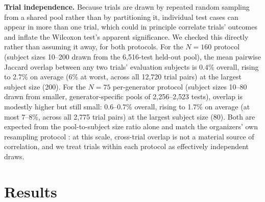 \documentclass[smallextended]{svjour3}
\begin{document}
\textbf{Trial independence.} Because trials are drawn by repeated random
sampling from a shared pool rather than by partitioning it, individual
test cases can appear in more than one trial, which could in principle
correlate trials' outcomes and inflate the Wilcoxon test's apparent
significance. We checked this directly rather than assuming it away, for
both protocols. For the $N=160$ protocol (subject sizes 10--200 drawn from
the 6{,}516-test held-out pool), the mean pairwise Jaccard overlap between
any two trials' evaluation subjects is 0.4\% overall, rising to 2.7\% on
average (6\% at worst, across all 12{,}720 trial pairs) at the largest
subject size (200). For the $N=75$ per-generator protocol (subject sizes
10--80 drawn from smaller, generator-specific pools of 2{,}256--2{,}523
tests), overlap is modestly higher but still small: 0.6--0.7\% overall,
rising to 1.7\% on average (at most 7--8\%, across all 2{,}775 trial
pairs) at the largest subject size (80). Both are expected from the
pool-to-subject size ratio alone and match the organizers' own resampling
protocol \citep{aryan2026icst}: at this scale, cross-trial overlap is not
a material source of correlation, and we treat trials within each
protocol as effectively independent draws.

\section{Results}
\label{sec:results}
\end{document}

